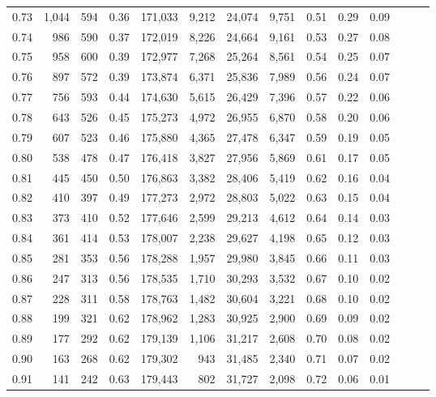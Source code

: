 \begin{tabular}{rrrrrrrrrrrrrr}
0.73 &  1,044 &  594 &  0.36 &  171,033 &    9,212 &  24,074 &   9,751 &  0.51 &  0.29 &      0.09 \\
0.74 &    986 &  590 &  0.37 &  172,019 &    8,226 &  24,664 &   9,161 &  0.53 &  0.27 &      0.08 \\
0.75 &    958 &  600 &  0.39 &  172,977 &    7,268 &  25,264 &   8,561 &  0.54 &  0.25 &      0.07 \\
0.76 &    897 &  572 &  0.39 &  173,874 &    6,371 &  25,836 &   7,989 &  0.56 &  0.24 &      0.07 \\
0.77 &    756 &  593 &  0.44 &  174,630 &    5,615 &  26,429 &   7,396 &  0.57 &  0.22 &      0.06 \\
0.78 &    643 &  526 &  0.45 &  175,273 &    4,972 &  26,955 &   6,870 &  0.58 &  0.20 &      0.06 \\
0.79 &    607 &  523 &  0.46 &  175,880 &    4,365 &  27,478 &   6,347 &  0.59 &  0.19 &      0.05 \\
0.80 &    538 &  478 &  0.47 &  176,418 &    3,827 &  27,956 &   5,869 &  0.61 &  0.17 &      0.05 \\
0.81 &    445 &  450 &  0.50 &  176,863 &    3,382 &  28,406 &   5,419 &  0.62 &  0.16 &      0.04 \\
0.82 &    410 &  397 &  0.49 &  177,273 &    2,972 &  28,803 &   5,022 &  0.63 &  0.15 &      0.04 \\
0.83 &    373 &  410 &  0.52 &  177,646 &    2,599 &  29,213 &   4,612 &  0.64 &  0.14 &      0.03 \\
0.84 &    361 &  414 &  0.53 &  178,007 &    2,238 &  29,627 &   4,198 &  0.65 &  0.12 &      0.03 \\
0.85 &    281 &  353 &  0.56 &  178,288 &    1,957 &  29,980 &   3,845 &  0.66 &  0.11 &      0.03 \\
0.86 &    247 &  313 &  0.56 &  178,535 &    1,710 &  30,293 &   3,532 &  0.67 &  0.10 &      0.02 \\
0.87 &    228 &  311 &  0.58 &  178,763 &    1,482 &  30,604 &   3,221 &  0.68 &  0.10 &      0.02 \\
0.88 &    199 &  321 &  0.62 &  178,962 &    1,283 &  30,925 &   2,900 &  0.69 &  0.09 &      0.02 \\
0.89 &    177 &  292 &  0.62 &  179,139 &    1,106 &  31,217 &   2,608 &  0.70 &  0.08 &      0.02 \\
0.90 &    163 &  268 &  0.62 &  179,302 &      943 &  31,485 &   2,340 &  0.71 &  0.07 &      0.02 \\
0.91 &    141 &  242 &  0.63 &  179,443 &      802 &  31,727 &   2,098 &  0.72 &  0.06 &      0.01 \\

\end{tabular}
